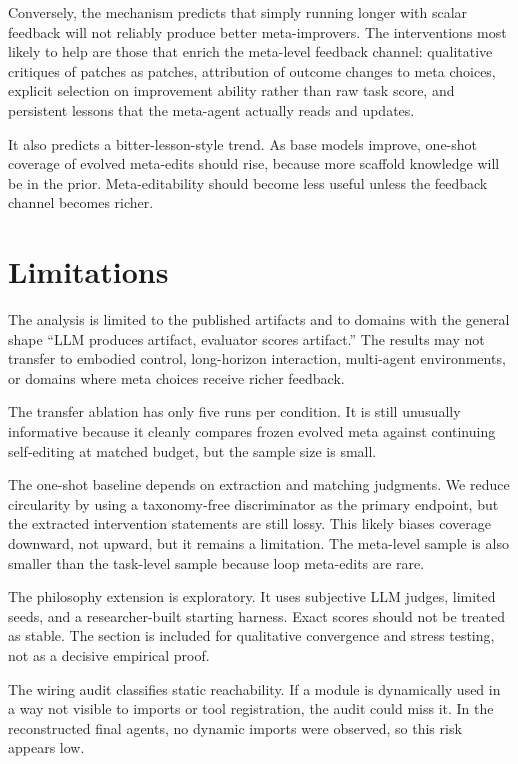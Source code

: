 \documentclass[11pt]{article}
\begin{document}
Conversely, the mechanism predicts that simply running longer with scalar feedback will not reliably produce better meta-improvers. The interventions most likely to help are those that enrich the meta-level feedback channel: qualitative critiques of patches as patches, attribution of outcome changes to meta choices, explicit selection on improvement ability rather than raw task score, and persistent lessons that the meta-agent actually reads and updates.

It also predicts a bitter-lesson-style trend. As base models improve, one-shot coverage of evolved meta-edits should rise, because more scaffold knowledge will be in the prior. Meta-editability should become less useful unless the feedback channel becomes richer.

\section{Limitations}\label{limitations}

The analysis is limited to the published artifacts and to domains with the general shape ``LLM produces artifact, evaluator scores artifact.'' The results may not transfer to embodied control, long-horizon interaction, multi-agent environments, or domains where meta choices receive richer feedback.

The transfer ablation has only five runs per condition. It is still unusually informative because it cleanly compares frozen evolved meta against continuing self-editing at matched budget, but the sample size is small.

The one-shot baseline depends on extraction and matching judgments. We reduce circularity by using a taxonomy-free discriminator as the primary endpoint, but the extracted intervention statements are still lossy. This likely biases coverage downward, not upward, but it remains a limitation. The meta-level sample is also smaller than the task-level sample because loop meta-edits are rare.

The philosophy extension is exploratory. It uses subjective LLM judges, limited seeds, and a researcher-built starting harness. Exact scores should not be treated as stable. The section is included for qualitative convergence and stress testing, not as a decisive empirical proof.

The wiring audit classifies static reachability. If a module is dynamically used in a way not visible to imports or tool registration, the audit could miss it. In the reconstructed final agents, no dynamic imports were observed, so this risk appears low.
\end{document}
